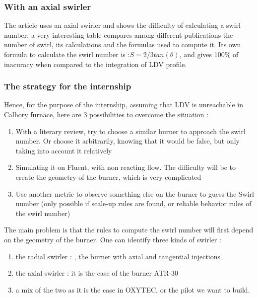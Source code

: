 \subsubsection{With an axial swirler}

The article\cite{palies_combined_2010}  uses an axial swirler and shows the difficulty of calculating a swirl number, a very interesting table compares among different publications the number of swirl, its calculations and the formulas used to compute it. Its own formula to calculate the swirl number is :$S=2/3 tan(\theta)$, and gives 100\% of inacuracy when compared to the integration of LDV profile.

\subsubsection{The strategy for the internship}

Hence, for the purpose of the internship, assuming that LDV is unreachable in Calhory furnace,  here are 3 possibilities to overcome the situation :
\begin{enumerate}
\item With a literary review, try to choose a similar burner to approach the swirl number. Or choose it arbitrarily, knowing that it would be false, but only taking into account it relatively
\item Simulating it on Fluent, with non reacting flow. The difficulty will be to create the geometry of the burner, which is very complicated
\item Use another metric to observe something else on the burner to guess the Swirl number (only possible if scale-up rules are found, or reliable behavior rules of the swirl number)
\end{enumerate}

The main problem is that the rules to compute the swirl number will first depend on the geometry of the burner. One can identify three kinds of swirler : 
\begin{enumerate}
\item the radial swirler : \cite{durox_flame_2013}, the burner with axial and tangential injections
\item the axial swirler : it is the case of the burner ATR-30
\item a mix of the two \cite{paul_jourdaine_nom_effect_2016} as it is the case in OXYTEC, or the pilot we want to build.
\end{enumerate}

